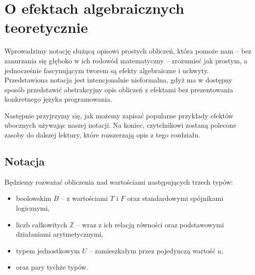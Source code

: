 
\chapter{O efektach algebraicznych teoretycznie}

Wprowadzimy notację służącą opisowi prostych obliczeń, która pomoże nam -- bez zanurzania się głęboko w ich rodowód matematyczny -- zrozumieć jak prostym, a jednocześnie fascynującym tworem są efekty algebraiczne i uchwyty. Przedstawiona notacja jest intencjonalnie nieformalna, gdyż ma w dostępny sposób przedstawić abstrakcyjny opis obliczeń z efektami bez prezentowania konkretnego języka programowania.

Następnie przyjrzymy się, jak możemy zapisać popularne przykłady efektów ubocznych używając naszej notacji. Na koniec, czytelnikowi zostaną polecone zasoby do dalszej lektury, które rozszerzają opis z tego rozdziału.

\section{Notacja}

\newcommand{\return}[1]{\mathbf{return}\ #1}
\newcommand{\op}[3]{#1(#2, #3)}
\newcommand{\opi}[3]{\op{op_{#1}}{#2}{#3}}
\newcommand{\handle}[2]{\mathbf{handle}\ #1\ \mathbf{with}\ #2}
\newcommand{\hcase}[3]{#1\ #2\ \Rightarrow\ #3}
\newcommand{\fun}[2]{\lambda #1.\ #2}
\newcommand{\eval}[1]{\llbracket\, #1\, \rrbracket}
\newcommand{\cond}[3]{\mathbf{if}\ #1\ \mathbf{then}\ #2\ \mathbf{else}\ #3}

Będziemy rozważać obliczenia nad wartościami następujących trzech typów:
\begin{itemize}
\item boolowskim \(B\) -- z wartościami \(T\) i \(F\) oraz standardowymi spójnikami logicznymi,
\item liczb całkowitych \(\mathbb{Z}\) -- wraz z ich relacją równości oraz podstawowymi działaniami arytmetycznymi,
\item typem jednostkowym \(U\) -- zamieszkałym przez pojedynczą wartość \(u\),
\item oraz pary tychże typów.
\end{itemize}

% 
% 

